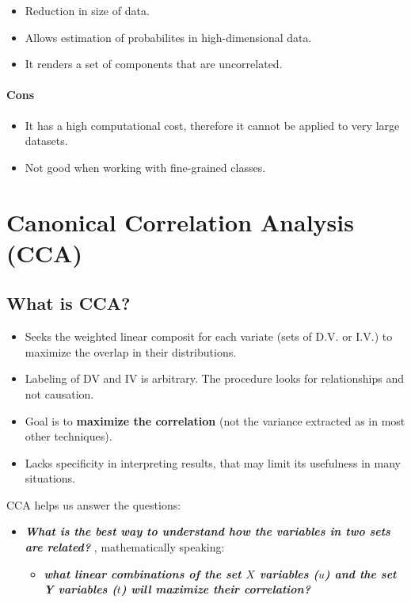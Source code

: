\documentclass[]{book}
\providecommand{\tightlist}{%
  \setlength{\itemsep}{0pt}\setlength{\parskip}{0pt}}
\begin{document}
\begin{itemize}
\tightlist
\item
  Reduction in size of data.
\item
  Allows estimation of probabilites in high-dimensional data.
\item
  It renders a set of components that are uncorrelated.
\end{itemize}

\subsubsection{\texorpdfstring{\textbf{Cons}}{Cons}}\label{cons}

\begin{itemize}
\tightlist
\item
  It has a high computational cost, therefore it cannot be applied to
  very large datasets.
\item
  Not good when working with fine-grained classes.
\end{itemize}

\chapter{Canonical Correlation Analysis
(CCA)}\label{canonical-correlation-analysis-cca}

\section{What is CCA?}\label{what-is-cca}

\begin{itemize}
\tightlist
\item
  Seeks the weighted linear composit for each variate (sets of D.V. or
  I.V.) to maximize the overlap in their distributions.
\item
  Labeling of DV and IV is arbitrary. The procedure looks for
  relationships and not causation.
\item
  Goal is to \textbf{maximize the correlation} (not the variance
  extracted as in most other techniques).
\item
  Lacks specificity in interpreting results, that may limit its
  usefulness in many situations.
\end{itemize}

CCA helps us answer the questions:

\begin{itemize}
\tightlist
\item
  \textbf{\emph{What is the best way to understand how the variables in
  two sets are related? }}, mathematically speaking:

  \begin{itemize}
  \tightlist
  \item
    \textbf{\emph{what linear combinations of the set \(X\) variables
    (\(u\)) and the set Y variables (\(t\)) will maximize their
    correlation?}}
  \end{itemize}
\end{itemize}
\end{document}
